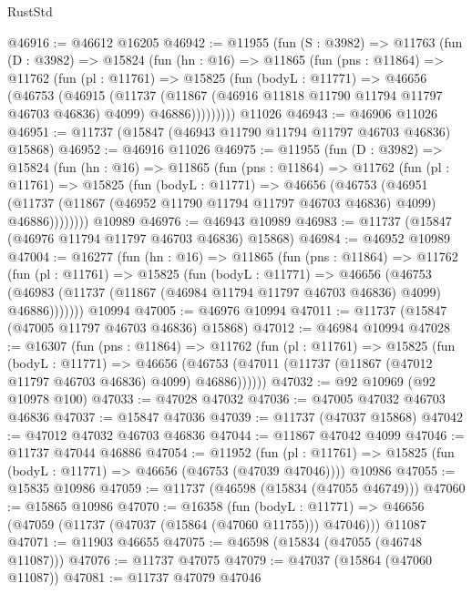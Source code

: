 \begin{lexlean}{RustStd}
\begin{coremodule}
@46916 := @46612 @16205
@46942 := @11955
    (fun (S : @3982) =>
    @11763
      (fun (D : @3982) =>
      @15824
        (fun (hn : @16) =>
        @11865
          (fun (pns : @11864) =>
          @11762
            (fun (pl : @11761) =>
            @15825
              (fun (bodyL : @11771) =>
              @46656
                (@46753
                  (@46915
                    (@11737
                      (@11867 (@46916 @11818 @11790 @11794 @11797 @46703 @46836) @4099)
                      @46886)))))))))
    @11026
@46943 := @46906 @11026
@46951 := @11737 (@15847 (@46943 @11790 @11794 @11797 @46703 @46836) @15868)
@46952 := @46916 @11026
@46975 := @11955
    (fun (D : @3982) =>
    @15824
      (fun (hn : @16) =>
      @11865
        (fun (pns : @11864) =>
        @11762
          (fun (pl : @11761) =>
          @15825
            (fun (bodyL : @11771) =>
            @46656
              (@46753
                (@46951
                  (@11737 (@11867 (@46952 @11790 @11794 @11797 @46703 @46836) @4099) @46886))))))))
    @10989
@46976 := @46943 @10989
@46983 := @11737 (@15847 (@46976 @11794 @11797 @46703 @46836) @15868)
@46984 := @46952 @10989
@47004 := @16277
    (fun (hn : @16) =>
    @11865
      (fun (pns : @11864) =>
      @11762
        (fun (pl : @11761) =>
        @15825
          (fun (bodyL : @11771) =>
          @46656
            (@46753
              (@46983 (@11737 (@11867 (@46984 @11794 @11797 @46703 @46836) @4099) @46886)))))))
    @10994
@47005 := @46976 @10994
@47011 := @11737 (@15847 (@47005 @11797 @46703 @46836) @15868)
@47012 := @46984 @10994
@47028 := @16307
    (fun (pns : @11864) =>
    @11762
      (fun (pl : @11761) =>
      @15825
        (fun (bodyL : @11771) =>
        @46656 (@46753 (@47011 (@11737 (@11867 (@47012 @11797 @46703 @46836) @4099) @46886))))))
@47032 := @92 @10969 (@92 @10978 @100)
@47033 := @47028 @47032
@47036 := @47005 @47032 @46703 @46836
@47037 := @15847 @47036
@47039 := @11737 (@47037 @15868)
@47042 := @47012 @47032 @46703 @46836
@47044 := @11867 @47042 @4099
@47046 := @11737 @47044 @46886
@47054 := @11952
    (fun (pl : @11761) => @15825 (fun (bodyL : @11771) => @46656 (@46753 (@47039 @47046))))
    @10986
@47055 := @15835 @10986
@47059 := @11737 (@46598 (@15834 (@47055 @46749)))
@47060 := @15865 @10986
@47070 := @16358
    (fun (bodyL : @11771) => @46656 (@47059 (@11737 (@47037 (@15864 (@47060 @11755))) @47046)))
    @11087
@47071 := @11903 @46655
@47075 := @46598 (@15834 (@47055 (@46748 @11087)))
@47076 := @11737 @47075
@47079 := @47037 (@15864 (@47060 @11087))
@47081 := @11737 @47079 @47046

\end{coremodule}
\end{lexlean}
